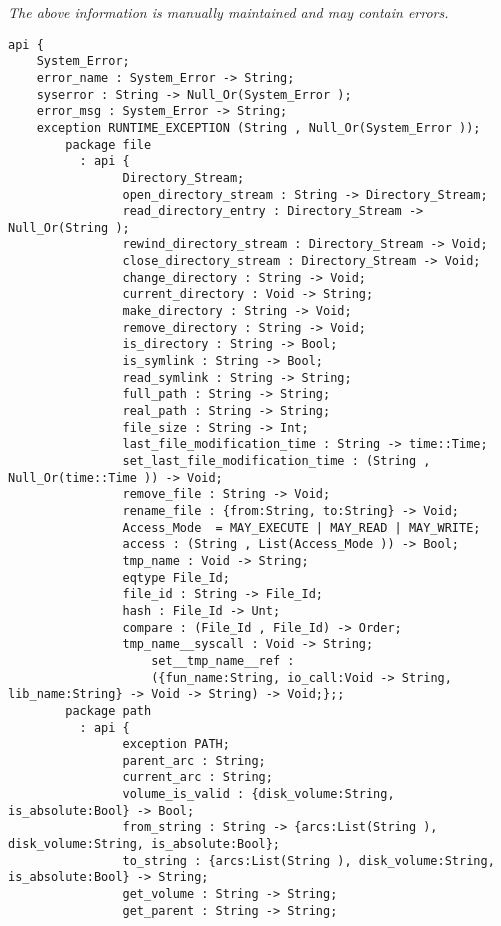 \label{api:Winix\_\_Premicrothread}

{\tiny \it The above information is manually maintained and may contain errors.}
\begin{verbatim}
api {
    System_Error;
    error_name : System_Error -> String;
    syserror : String -> Null_Or(System_Error );
    error_msg : System_Error -> String;
    exception RUNTIME_EXCEPTION (String , Null_Or(System_Error ));
        package file
          : api {
                Directory_Stream;
                open_directory_stream : String -> Directory_Stream;
                read_directory_entry : Directory_Stream -> Null_Or(String );
                rewind_directory_stream : Directory_Stream -> Void;
                close_directory_stream : Directory_Stream -> Void;
                change_directory : String -> Void;
                current_directory : Void -> String;
                make_directory : String -> Void;
                remove_directory : String -> Void;
                is_directory : String -> Bool;
                is_symlink : String -> Bool;
                read_symlink : String -> String;
                full_path : String -> String;
                real_path : String -> String;
                file_size : String -> Int;
                last_file_modification_time : String -> time::Time;
                set_last_file_modification_time : (String , Null_Or(time::Time )) -> Void;
                remove_file : String -> Void;
                rename_file : {from:String, to:String} -> Void;
                Access_Mode  = MAY_EXECUTE | MAY_READ | MAY_WRITE;
                access : (String , List(Access_Mode )) -> Bool;
                tmp_name : Void -> String;
                eqtype File_Id;
                file_id : String -> File_Id;
                hash : File_Id -> Unt;
                compare : (File_Id , File_Id) -> Order;
                tmp_name__syscall : Void -> String;
                    set__tmp_name__ref :
                    ({fun_name:String, io_call:Void -> String, lib_name:String} -> Void -> String) -> Void;};;
        package path
          : api {
                exception PATH;
                parent_arc : String;
                current_arc : String;
                volume_is_valid : {disk_volume:String, is_absolute:Bool} -> Bool;
                from_string : String -> {arcs:List(String ), disk_volume:String, is_absolute:Bool};
                to_string : {arcs:List(String ), disk_volume:String, is_absolute:Bool} -> String;
                get_volume : String -> String;
                get_parent : String -> String;

\end{verbatim}
